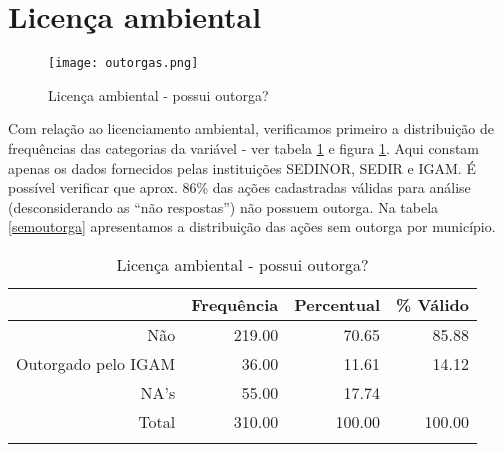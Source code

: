 \documentclass[a4paper, 12pt, openright, oneside, english, brazil, article]{abntex2}
\begin{document}
	
	\section{Licença ambiental}
	
	\begin{figure}[!h]
		\centering
		\caption{Licença ambiental - possui outorga?}
		\label{outorga-fig}
		\texttt{[image: outorgas.png]}
	\end{figure}
	
	Com relação ao licenciamento ambiental, verificamos primeiro a distribuição de frequências das categorias da variável - ver tabela \ref{outorga} e figura \ref{outorga-fig}. Aqui constam apenas os dados fornecidos pelas instituições SEDINOR, SEDIR e IGAM. É possível verificar que aprox. 86\% das ações cadastradas válidas para análise (desconsiderando as ``não respostas'') não possuem outorga. Na tabela \ref{semoutorga} apresentamos a distribuição das ações sem outorga por município.
	
	

	\begin{scriptsize}
	\begin{longtable}{rrrr}
		\caption{Licença ambiental - possui outorga?} \\ 
		\hline
		& Frequência & Percentual & \% Válido \\ 
		\hline
		Não & 219.00 & 70.65 & 85.88 \\ 
		Outorgado pelo IGAM & 36.00 & 11.61 & 14.12 \\ 
		NA's & 55.00 & 17.74 &  \\ 
		Total & 310.00 & 100.00 & 100.00 \\ 
		\hline
		\hline
		\label{outorga}
	\end{longtable}
	\end{scriptsize}
\end{document}
